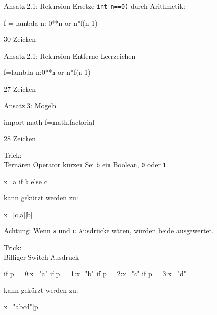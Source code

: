 \documentclass[xcolor=dvipsnames, aspectratio=43, 14pt]{beamer}
\begin{document}
\begin{frame}[fragile]{Ansatz 2.1: Rekursion}
	Ersetze \texttt{int(n==0)} durch Arithmetik:
	
	\vfill
	
	\begin{python3code}
	f = lambda n: 0**n or n*f(n-1)
	\end{python3code}
	
	\vfill
	
	30 Zeichen
\end{frame}

\begin{frame}[fragile]{Ansatz 2.1: Rekursion}
	Entferne Leerzeichen:
	
	\vfill
	
	\begin{python3code}
	f=lambda n:0**n or n*f(n-1)
	\end{python3code}
	
	\vfill
	
	27 Zeichen
\end{frame}

\begin{frame}[fragile]{Ansatz 3: Mogeln}
	\begin{python3code}
	import math
	f=math.factorial
	\end{python3code}
	
	\vfill
	
	28 Zeichen
\end{frame}

\begin{frame}[fragile]{Trick:\\ Ternären Operator kürzen}
	Sei \texttt{b} ein Boolean, \texttt{0} oder \texttt{1}.
	
	\vfill
	
	\begin{python3code}
	x=a if b else c
	\end{python3code}
	
	\vfill
	
	kann gekürzt werden zu:
	
	\vfill
	
	\begin{python3code}
	x=[c,a][b]
	\end{python3code}
	
	\pause
	
	Achtung: Wenn \texttt{a} und \texttt{c} Ausdrücke wären, würden beide ausgewertet.
\end{frame}

\begin{frame}[fragile]{Trick:\\ Billiger Switch-Ausdruck}
	\begin{python3code}
	if p==0:x="a"
	if p==1:x="b"
	if p==2:x="c"
	if p==3:x="d"
	\end{python3code}
	
	\vfill
	
	kann gekürzt werden zu:
	
	\vfill
	
	\begin{python3code}
	x="abcd"[p]
	\end{python3code}
\end{frame}
\end{document}
